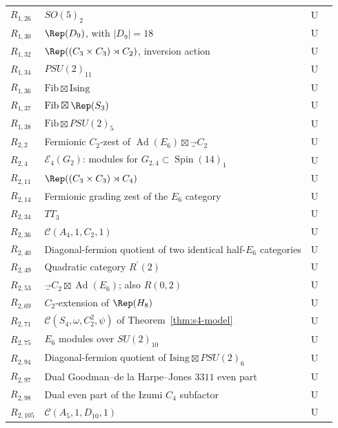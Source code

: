 \begin{longtable}{@{}lp{8.0cm}cl@{}}
$R_{1,26}$ & $SO(5)_2$ & U & \cite{LPR}\\
$R_{1,30}$ & $\Rep(D_9)$, with $|D_9|=18$ & U & \cite{LPR}\\
$R_{1,32}$ & $\Rep((C_3\times C_3)\rtimes C_2)$, inversion action & U & \cite{LPR}\\
$R_{1,34}$ & $PSU(2)_{11}$ & U & \cite{LPR}\\
$R_{1,36}$ & $\mathrm{Fib}\boxtimes\mathrm{Ising}$ & U & \cite{LPR}\\
$R_{1,37}$ & $\mathrm{Fib}\boxtimes\Rep(S_3)$ & U & \cite{LPR}\\
$R_{1,38}$ & $\mathrm{Fib}\boxtimes PSU(2)_5$ & U & \cite{LPR}\\
\addlinespace
$R_{2,2}$ & Fermionic $C_2$-zest of $\operatorname{Ad}(E_6)\boxtimes\Vec_{C_2}$ & U & \cite{DGP}\\
$R_{2,4}$ & $\mathcal E_4(G_2)$: modules for $G_{2,4}\subset\operatorname{Spin}(14)_1$ & U & \cite{CRT}\\
$R_{2,11}$ & $\Rep((C_3\times C_3)\rtimes C_4)$ & U & \cite{EGNO}\\
$R_{2,14}$ & Fermionic grading zest of the $E_6$ category & U & \cite{DGP}\\
$R_{2,34}$ & $TT_3$ & U & \cite{EM}\\
$R_{2,36}$ & $\mathcal C(A_4,1,C_2,1)$ & U & \cite{Integral}\\
$R_{2,40}$ & Diagonal-fermion quotient of two identical half-$E_6$ categories & U & \cite{ALW}\\
$R_{2,49}$ & Quadratic category $R^{\prime}(2)$ & U & \cite{MY}\\
$R_{2,53}$ & $\Vec_{C_2}\boxtimes\operatorname{Ad}(E_6)$; also $R(0,2)$ & U & \cite{MY}\\
$R_{2,69}$ & $C_2$-extension of $\Rep(H_8)$ & U & \cite{CLS}\\
$R_{2,71}$ & $\mathcal C(S_4,\omega,C_2^2,\psi)$ of Theorem~\ref{thm:s4-model} & U & \cite{GNgt}\\
$R_{2,75}$ & $E_6$ modules over $SU(2)_{10}$ & U & \cite{KO}\\
$R_{2,94}$ & Diagonal-fermion quotient of $\mathrm{Ising}\boxtimes PSU(2)_6$ & U & \cite{EGNO}\\
$R_{2,97}$ & Dual Goodman--de la Harpe--Jones $3311$ even part & U & \cite{IJMS}\\
$R_{2,98}$ & Dual even part of the Izumi $C_4$ subfactor & U & \cite{IMP}\\
$R_{2,105}$ & $\mathcal C(A_5,1,D_{10},1)$ & U & \cite{Integral}\\

\end{longtable}
